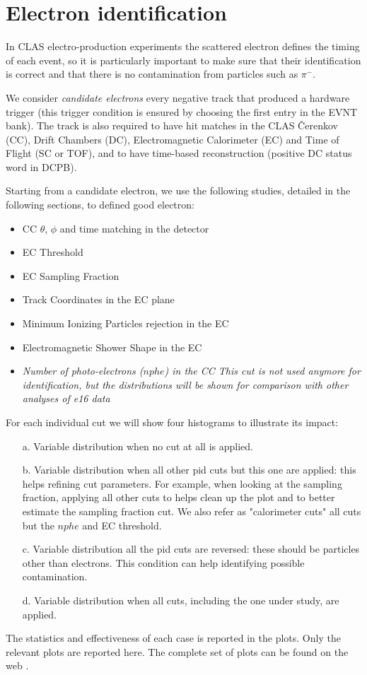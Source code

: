 \clearpage\newpage
\section{Electron identification}

In CLAS electro-production experiments
the scattered electron defines the timing of each event,
so it is particularly important to
make sure that their identification is correct and that
there is no contamination from particles such as $\pi^-$.

We consider {\it candidate electrons} every negative track
that produced a hardware trigger (this trigger condition is ensured by choosing
the first entry in the EVNT bank). The track is also required to have
hit matches in the CLAS \v Cerenkov (CC)\cite{bib:cc}, Drift Chambers (DC)\cite{bib:dc},
Electromagnetic Calorimeter (EC)\cite{bib:ec} and Time of Flight (SC or TOF)\cite{bib:ftof},
and to have time-based reconstruction (positive DC status word in DCPB).

Starting from a candidate electron, we use the following studies, detailed in the following sections,
to defined good electron:

\begin{itemize}
	\item CC $\theta$, $\phi$ and time matching in the  detector
	\item EC Threshold 
	\item EC Sampling Fraction 
	\item Track Coordinates in the EC plane 
	\item Minimum Ionizing Particles rejection in the EC
	\item Electromagnetic Shower Shape in the EC
	\item {\it Number of photo-electrons ($nphe$) in the CC
              This cut is not used anymore for identification,
              but the distributions will be shown for comparison with other analyses of e16 data }
\end{itemize}

For each individual cut we will show four histograms to illustrate its impact:

\begin{itemize}  
	\item[a.] Variable distribution when no cut at all is applied.
	\item[b.] Variable distribution when all other pid cuts but this one are applied:
	          this helps refining cut parameters.
	          For example, when looking at the sampling fraction, applying all other
	          cuts to helps clean up the plot and to better estimate the sampling fraction
	          cut. We also refer as "calorimeter cuts" all cuts but the $nphe$ and EC threshold.
	\item[c.] Variable distribution all the pid cuts are reversed: these should be particles other than electrons.
	          This condition can help identifying possible contamination.
	\item[d.] Variable distribution when all cuts, including the one under study, are applied.
\end{itemize}

The statistics and effectiveness of each case is reported in the plots.
Only the relevant plots are reported here.
The complete set of plots can be found on the web \cite{bib:pi0_resonance_id_electron}.
